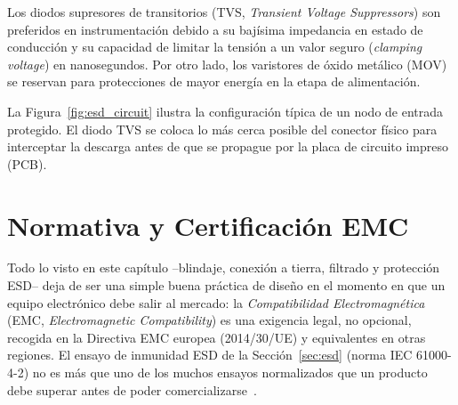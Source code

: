 Los diodos supresores de transitorios (TVS, \textit{Transient Voltage Suppressors}) son preferidos en instrumentación debido a su bajísima impedancia en estado de conducción y su capacidad de limitar la tensión a un valor seguro (\textit{clamping voltage}) en nanosegundos. Por otro lado, los varistores de óxido metálico (MOV) se reservan para protecciones de mayor energía en la etapa de alimentación.

La Figura~\ref{fig:esd_circuit} ilustra la configuración típica de un nodo de entrada protegido. El diodo TVS se coloca lo más cerca posible del conector físico para interceptar la descarga antes de que se propague por la placa de circuito impreso (PCB).

\begin{marginfigure}
    \centering
    \caption[Esquema típico de protección ESD.]{Esquema típico de protección ESD en una entrada de instrumentación. El diodo TVS deriva la corriente del transitorio a tierra antes de que esta atraviese la resistencia limitadora y alcance el sistema interno.}\label{fig:esd_circuit}
\end{marginfigure}

\section{Normativa y Certificación EMC}\label{sec:normativa_emc}

Todo lo visto en este capítulo --blindaje, conexión a tierra, filtrado y protección ESD-- deja de ser una simple buena práctica de diseño en el momento en que un equipo electrónico debe salir al mercado: la \emph{Compatibilidad Electromagnética} (EMC, \textit{Electromagnetic Compatibility}) es una exigencia legal, no opcional, recogida en la Directiva EMC europea (2014/30/UE) y equivalentes en otras regiones. El ensayo de inmunidad ESD de la Sección~\ref{sec:esd} (norma IEC 61000-4-2) no es más que uno de los muchos ensayos normalizados que un producto debe superar antes de poder comercializarse~\cite{paul2006emc}.

